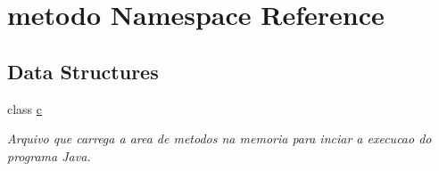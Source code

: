 \hypertarget{namespacemetodo}{}\section{metodo Namespace Reference}
\label{namespacemetodo}
\subsection*{Data Structures}
\begin{DoxyCompactItemize}
\item 
class \hyperlink{classmetodo_1_1c}{c}
\begin{DoxyCompactList}\small\item\em Arquivo que carrega a area de metodos na memoria para inciar a execucao do programa Java. \end{DoxyCompactList}\end{DoxyCompactItemize}
